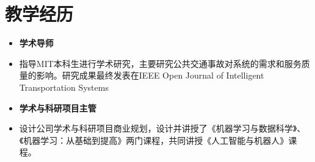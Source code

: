 \section{教学经历}
\begin{itemize}[parsep=0.5ex]
  \item \textbf{学术导师}
  \item 指导MIT本科生进行学术研究，主要研究公共交通事故对系统的需求和服务质量的影响。研究成果最终发表在IEEE Open Journal of Intelligent Transportation Systems
\end{itemize}
\begin{itemize}[parsep=0.5ex]
  \item \textbf{学术与科研项目主管}
  \item 设计公司学术与科研项目商业规划，设计并讲授了《机器学习与数据科学》、《机器学习：从基础到提高》两门课程，共同讲授《人工智能与机器人》课程。
\end{itemize}
